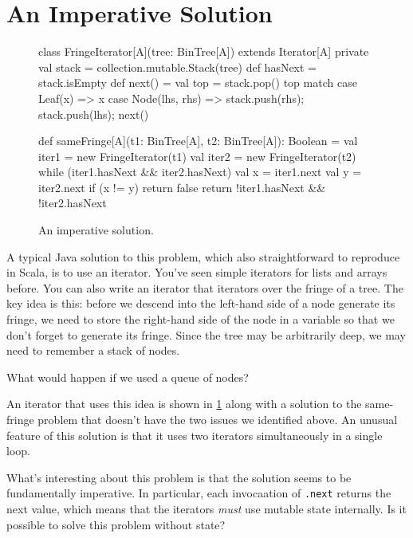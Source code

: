 \section{An Imperative Solution}

\begin{figure}
\begin{scalacode}
class FringeIterator[A](tree: BinTree[A]) extends Iterator[A] {
  private val stack = collection.mutable.Stack(tree)
  def hasNext = stack.isEmpty
  def next() = {
    val top = stack.pop()
    top match {
      case Leaf(x) => x
      case Node(lhs, rhs) => { stack.push(rhs); stack.push(lhs); next() }
    }
  }
}

def sameFringe[A](t1: BinTree[A], t2: BinTree[A]): Boolean = {
  val iter1 = new FringeIterator(t1)
  val iter2 = new FringeIterator(t2)
  while (iter1.hasNext && iter2.hasNext) {
    val x = iter1.next
    val y = iter2.next
    if (x != y) {
      return false
    }
  }
  return !iter1.hasNext && !iter2.hasNext
}
\end{scalacode}
\caption{An imperative solution.}
\label{samefringe_imperative}
\end{figure}

A typical Java solution to this problem, which also straightforward to
reproduce in Scala, is to use an iterator. You've seen simple
iterators for lists and arrays before.  You can also write an iterator
that iterators over the fringe of a tree.  The key idea is this:
before we descend into the left-hand side of a node generate its
fringe, we need to store the right-hand side of the node in a variable so that
we don't forget to generate its fringe. Since the tree may be arbitrarily deep, we
may need to remember a stack of nodes.

\begin{think}
What would happen if we used a queue of nodes?
\end{think}

An iterator that uses this idea is shown in \cref{samefringe_imperative} along with a
solution to the same-fringe problem that doesn't have the two issues we identified
above. An unusual feature of this solution is that it uses two iterators simultaneously
in a single loop.

What's interesting about this problem is that the solution seems to be fundamentally
imperative. In particular, each invocaation of \verb|.next| returns the next value, which
means that the iterators \emph{must} use mutable state internally. Is it possible to solve
this problem without state?


